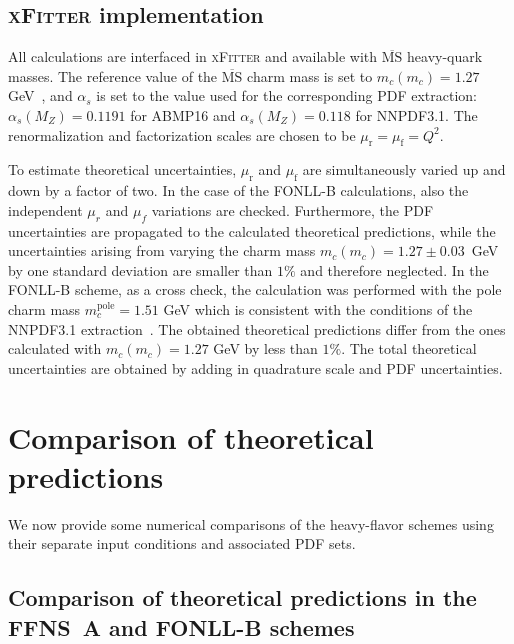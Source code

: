 \documentclass[pdftex,twocolumn,epjc3]{svjour3}          %
\newcommand{\abmp} {ABMP16\xspace}
\newcommand{\nnpdf} {NNPDF3.1\xspace}
\newcommand{\xfitter} {\textsc{xFitter}\xspace}
\newcommand{\fonll} {{FONLL-B}\xspace}
\newcommand{\ffns} {{FFNS~A}\xspace}
\begin{document}
\subsection{\xfitter implementation}

All calculations are interfaced in \xfitter and available with
$\overline{\mbox{MS}}$ heavy-quark masses. The reference value of the
$\overline{\mbox{MS}}$ charm mass is set to $m_c(m_c) = 1.27$
GeV~\cite{Tanabashi:2018oca}, and $\alpha_s$ is set to the value used
for the corresponding PDF extraction: $\alpha_s(M_Z) = 0.1191$ for
\abmp and $\alpha_s(M_Z) = 0.118$ for \nnpdf.  The renormalization and
factorization scales are chosen to be
$\mu_\mathrm{r} = \mu_\mathrm{f} = Q^2$.

To estimate theoretical uncertainties, $\mu_\mathrm{r}$ and
$\mu_\mathrm{f}$ are simultaneously varied up and down by a factor of 
two. In the case of the \fonll calculations, also the independent
$\mu_r$ and $\mu_f$ variations are checked. Furthermore, the PDF
uncertainties are propagated to the calculated theoretical
predictions, while the uncertainties arising from varying the charm
mass $m_c(m_c) = 1.27 \pm 0.03$~GeV by one standard deviation are
smaller than $1\%$ and therefore neglected. In the \fonll scheme, as a
cross check, the calculation was performed with the pole charm mass
$m_c^{\text{pole}} = 1.51$ GeV which is consistent with the conditions
of the \nnpdf extraction~\cite{Ball:2017nwa}. The obtained theoretical
predictions differ from the ones calculated with $m_c(m_c) = 1.27$ GeV
by less than $1\%$. The total theoretical uncertainties are obtained
by adding in quadrature scale and PDF uncertainties.

\section{Comparison of theoretical predictions}
\label{sec:thpred-comparison}

We now provide some numerical comparisons of the heavy-flavor schemes
using their separate input conditions and associated PDF sets.

\subsection{Comparison of theoretical predictions in the \ffns and \fonll schemes}
\label{sec:compareI}
\end{document}
